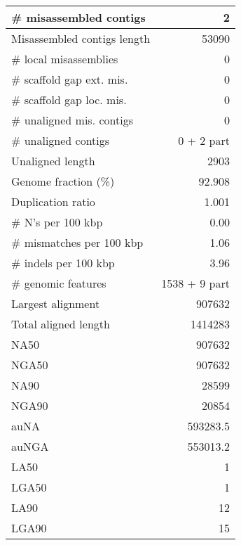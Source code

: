\documentclass[12pt,a4paper]{article}
\begin{document}
\begin{table}[ht]
\begin{center}
\begin{tabular}{|l*{1}{|r}|}
\# misassembled contigs & 2 \\ \hline
Misassembled contigs length & 53090 \\ \hline
\# local misassemblies & 0 \\ \hline
\# scaffold gap ext. mis. & 0 \\ \hline
\# scaffold gap loc. mis. & 0 \\ \hline
\# unaligned mis. contigs & 0 \\ \hline
\# unaligned contigs & 0 + 2 part \\ \hline
Unaligned length & 2903 \\ \hline
Genome fraction (\%) & 92.908 \\ \hline
Duplication ratio & 1.001 \\ \hline
\# N's per 100 kbp & 0.00 \\ \hline
\# mismatches per 100 kbp & 1.06 \\ \hline
\# indels per 100 kbp & 3.96 \\ \hline
\# genomic features & 1538 + 9 part \\ \hline
Largest alignment & 907632 \\ \hline
Total aligned length & 1414283 \\ \hline
NA50 & 907632 \\ \hline
NGA50 & 907632 \\ \hline
NA90 & 28599 \\ \hline
NGA90 & 20854 \\ \hline
auNA & 593283.5 \\ \hline
auNGA & 553013.2 \\ \hline
LA50 & 1 \\ \hline
LGA50 & 1 \\ \hline
LA90 & 12 \\ \hline
LGA90 & 15 \\ \hline
\end{tabular}
\end{center}
\end{table}
\end{document}
